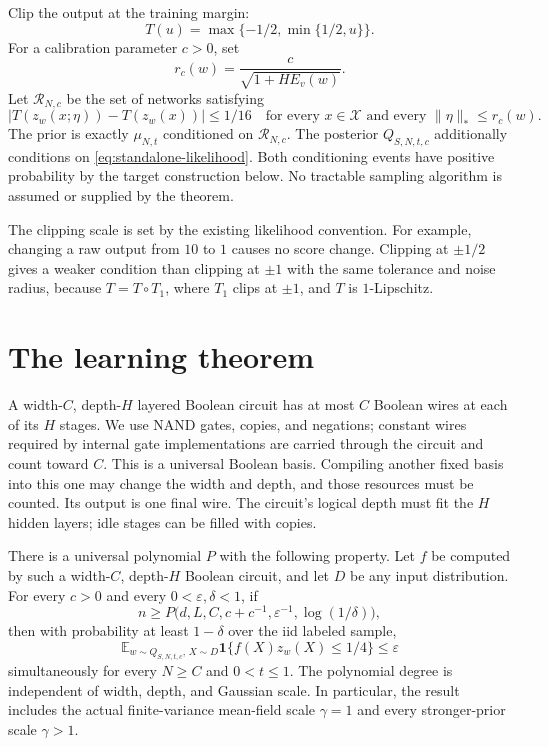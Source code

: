Clip the output at the training margin:
\[
 T(u)=\max\{-1/2,\min\{1/2,u\}\}.
\]
For a calibration parameter $c>0$, set
\begin{equation}\label{eq:standalone-radius}
 r_c(w)=\frac{c}{\sqrt{1+H E_v(w)}}.
\end{equation}
Let $\mathcal R_{N,c}$ be the set of networks satisfying
\begin{equation}\label{eq:standalone-support}
 |T(z_w(x;\eta))-T(z_w(x))|\le1/16
 \quad\text{for every }x\in\mathcal X
 \text{ and every }\|\eta\|_*\le r_c(w).
\end{equation}
The prior is exactly $\mu_{N,t}$ conditioned on $\mathcal R_{N,c}$.
The posterior $Q_{S,N,t,c}$ additionally conditions on
\eqref{eq:standalone-likelihood}. Both conditioning events have positive
probability by the target construction below. No tractable sampling
algorithm is assumed or supplied by the theorem.

The clipping scale is set by the existing likelihood convention. For
example, changing a raw output from $10$ to $1$ causes no score change.
Clipping at $\pm1/2$ gives a weaker condition than clipping at $\pm1$ with
the same tolerance and noise radius, because
$T=T\circ T_1$, where $T_1$ clips at $\pm1$, and $T$ is $1$-Lipschitz.

\section{The learning theorem}
\label{sec:theory-main}

A width-$C$, depth-$H$ layered Boolean circuit has at most $C$ Boolean wires
at each of its $H$ stages. We use NAND gates, copies, and negations;
constant wires required by internal gate implementations are carried
through the circuit and count toward $C$. This is a universal Boolean
basis. Compiling another fixed basis into this one may change the width
and depth, and those resources must be counted. Its output is one final wire.
The circuit's logical depth must fit the $H$ hidden layers; idle stages
can be filled with copies.

\begin{theorem}
\label{thm:standalone-clipped}
There is a universal polynomial $P$ with the following property. Let $f$
be computed by such a width-$C$, depth-$H$ Boolean circuit, and let $D$ be
any input distribution. For every $c>0$ and every $0<\varepsilon,\delta<1$, if
\[
 n\ge P\bigl(d,L,C,c+c^{-1},\varepsilon^{-1},\log(1/\delta)\bigr),
\]
then with probability at least $1-\delta$ over the iid labeled sample,
\begin{equation}\label{eq:standalone-risk}
 \mathbb E_{w\sim Q_{S,N,t,c},\,X\sim D}
       \mathbf1\{f(X)z_w(X)\le1/4\}\le\varepsilon
\end{equation}
simultaneously for every $N\ge C$ and $0<t\le1$.
The polynomial degree is independent of width, depth, and Gaussian scale.
In particular, the result includes the actual finite-variance mean-field
scale $\gamma=1$ and every stronger-prior scale $\gamma>1$.
\end{theorem}

